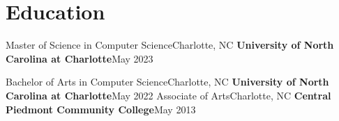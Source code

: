 \section{Education}
  \resumeSubHeadingListStart

    \resumeSubheading
      {\color{blue}Master of Science in Computer Science}{Charlotte, NC}
      {\textbf{University of North Carolina at Charlotte}}{May 2023}
      \resumeItemListStart
      \resumeItemListEnd

    \vspace{-5pt}

    \resumeSubheading
      {\color{blue}Bachelor of Arts in Computer Science}{Charlotte, NC}
      {\textbf{University of North Carolina at Charlotte}}{May 2022}
      \resumeItemListStart
      \resumeItemListEnd
    \vspace{-5pt}
    \resumeSubheading
      {\color{blue}Associate of Arts}{Charlotte, NC}
      {\textbf{Central Piedmont Community College}}{May 2013}
      \resumeItemListStart

      \resumeItemListEnd  
      
  \resumeSubHeadingListEnd